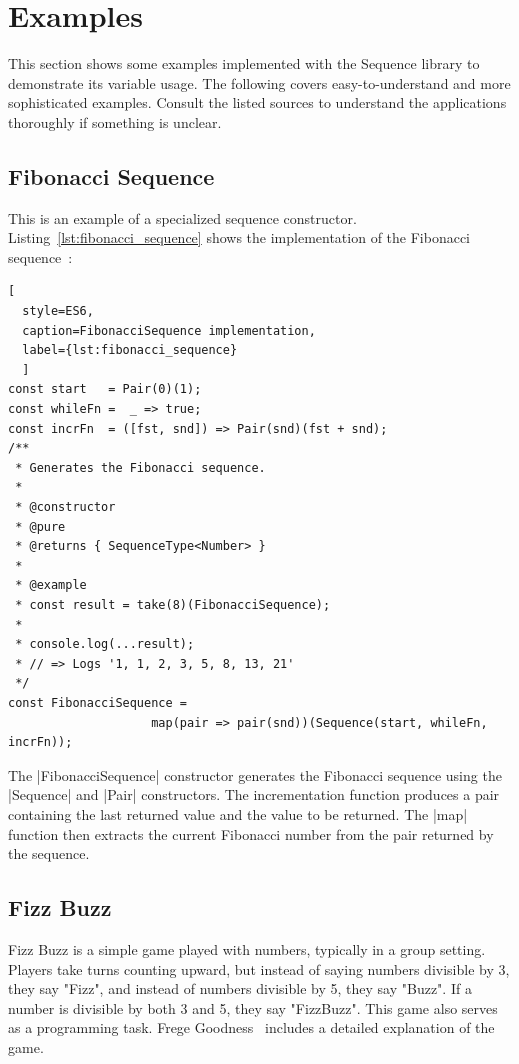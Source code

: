 \section{Examples} %
\label{sec:Examples}
This section shows some examples implemented with the
Sequence library to demonstrate its variable usage.
The following covers easy-to-understand and more sophisticated
examples. Consult the listed sources to understand the applications
thoroughly if something is unclear.

\subsection{Fibonacci Sequence}
\label{sub:Fibonacci Sequence}
This is an example of a specialized sequence constructor.
Listing~\ref{lst:fibonacci_sequence} shows the implementation of the Fibonacci 
sequence~\cite[p.~36]{math_diskrete_2011}:
\begin{lstlisting}[
  style=ES6, 
  caption=FibonacciSequence implementation,
  label={lst:fibonacci_sequence}
  ]
const start   = Pair(0)(1);
const whileFn =  _ => true;
const incrFn  = ([fst, snd]) => Pair(snd)(fst + snd);
/**
 * Generates the Fibonacci sequence.
 *
 * @constructor
 * @pure
 * @returns { SequenceType<Number> }
 *
 * @example
 * const result = take(8)(FibonacciSequence);
 *
 * console.log(...result);
 * // => Logs '1, 1, 2, 3, 5, 8, 13, 21'
 */
const FibonacciSequence = 
                    map(pair => pair(snd))(Sequence(start, whileFn, incrFn));
\end{lstlisting}
The |FibonacciSequence| constructor generates the Fibonacci sequence using the
|Sequence| and |Pair| constructors. The incrementation function produces a pair
containing the last returned value and the value to be returned.  The |map|
function then extracts the current Fibonacci number from the pair returned by
the sequence.

\subsection{Fizz Buzz}
\label{sub:Fizz Buzz}
Fizz Buzz is a simple game played with numbers, typically in a group setting. Players
take turns counting upward, but instead of saying numbers divisible by 3, they
say "Fizz", and instead of numbers divisible by 5, they say "Buzz". If a number
is divisible by both 3 and 5, they say "FizzBuzz". This game also serves as a 
programming task.
\newline
Frege Goodness~\cite{frege_goodness} includes a detailed explanation of the
game. 

